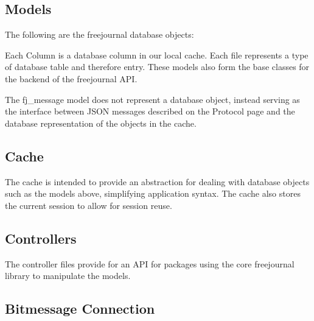 \documentclass[letterpaper,10pt,oneside]{sphinxmanual}
\begin{document}
\subsection{Models}
\label{architecture:models}
The following are the freejournal database objects:



Each Column is a database column in our local cache.  Each file represents a type
of database table and therefore entry.  These models also form the base classes
for the backend of the freejournal API.

The fj\_message model does not represent a database object, instead serving as the interface
between JSON messages described on the Protocol page and the database representation of the objects in the cache.


\subsection{Cache}
\label{architecture:cache}


The cache is intended to provide an abstraction for dealing with database objects
such as the models above, simplifying application syntax.  The cache also stores
the current session to allow for session reuse.


\subsection{Controllers}
\label{architecture:controllers}

The controller files provide for an API for packages using the core freejournal
library to manipulate the models.


\subsection{Bitmessage Connection}
\label{architecture:bitmessage-connection}
\end{document}
